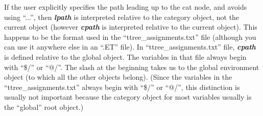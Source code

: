 \documentclass[11pt]{article}
\begin{document}
If the user explicitly specifies the path leading up to the cat node, and avoids using ``...'', then \textit{\textbf{lpath}} is interpreted relative to the category object, not the current object (however \textit{\textbf{cpath}} is interpreted relative to the current object). This happens to be the format used in the ``ttree\_assignments.txt'' file (although you can use it anywhere else in an ``.ET'' file).  In ``ttree\_assignments.txt'' file, \textit{\textbf{cpath}} is defined relative to the global object. The variables in that file always begin with ``\$/'' or ``@/''.  The slash at the beginning takes us to the global environment object (to which all the other objects belong).  (Since the variables in the ``ttree\_assignments.txt'' always begin with ``\$/'' or ``@/'', this distinction is usually not important because the category object for most variables usually is the ``global'' root object.)




\end{document}
